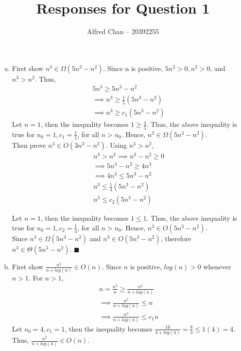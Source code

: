 \documentclass[12pt]{article}
\title{Responses for Question 1}
\author{Alfred Chan -- 20392255}
\begin{document}
\maketitle

\begin{enumerate}[a.]

\item
{
First show $n^3 \in \Omega(5n^3-n^2)$. Since n is positive, $5n^3 > 0, n^2>0$, and $n^3>n^2$. Thus,
\begin{gather*}
5n^3 \ge 5n^3 - n^2\\
\implies n^3 \ge \frac{1}{5}(5n^3-n^2)\\
\implies n^3 \ge c_1(5n^3-n^2)
\end{gather*}
Let $n=1$, then the inequality becomes $1 \ge \frac{4}{5}$.
Thus, the above inequality is true for $n_0 = 1, c_1=\frac{1}{5}$, for all $n > n_0$. Hence, $n^3 \in \Omega(5n^3 - n^2)$.\\

Then prove $n^3 \in O(3n^2-n^2)$. Using $n^3>n^2$,
\begin{gather*}
n^3 > n^2 \implies n^3 - n^2 \ge 0\\ 
\implies 5n^3 -n^2 \ge 4n^3\\
\implies 4n^3 \le 5n^3 -n^2\\
n^3 \le \frac{1}{4}(5n^3 -n^2)\\
n^3 \le c_2(5n^3 -n^2)
\end{gather*}

Let $n=1$, then the inequality becomes $1 \le 1$.
Thus, the above inequality is true for $n_0 = 1, c_2=\frac{1}{4}$, for all $n > n_0$. Hence, $n^3 \in O(5n^3 - n^2)$.\\

Since $n^3 \in \Omega(5n^3-n^2)$ and $n^3 \in O(5n^3-n^2)$, therefore $n^3 \in \Theta(5n^3-n^2)$.
\hfill $\blacksquare$
}

\item
{\bf

First show $\frac{n^2}{n+log(n)} \in O(n)$. Since $n$ is positive, $log(n) > 0$ whenever $n > 1$. For $n > 1$,
\begin{gather*}
n = \frac{n^2}{n} \ge \frac{n^2}{n+log(n)}\\
\implies  \frac{n^2}{n+log(n)} \le n\\
\implies  \frac{n^2}{n+log(n)} \le c_1n
\end{gather*}
Let $n_0 = 4, c_1 = 1$, then the inequality becomes $\frac{16}{4+log(4)}=\frac{8}{3} \le 1(4) = 4$.
Thus, $\frac{n^2}{n+log(n)} \in O(n)$.\\

}
\end{enumerate}
\end{document}
